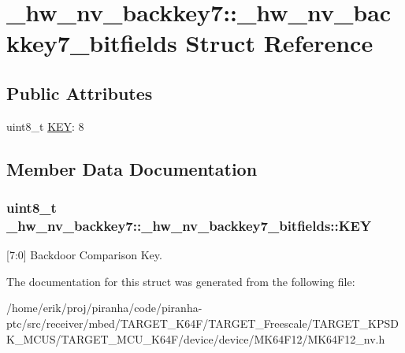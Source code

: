 \hypertarget{struct__hw__nv__backkey7_1_1__hw__nv__backkey7__bitfields}{}\section{\+\_\+hw\+\_\+nv\+\_\+backkey7\+:\+:\+\_\+hw\+\_\+nv\+\_\+backkey7\+\_\+bitfields Struct Reference}
\label{struct__hw__nv__backkey7_1_1__hw__nv__backkey7__bitfields}
\subsection*{Public Attributes}
\begin{DoxyCompactItemize}
\item 
uint8\+\_\+t \hyperlink{struct__hw__nv__backkey7_1_1__hw__nv__backkey7__bitfields_ab794b65e020e429fd70de58dee9d775e}{K\+EY}\+: 8
\end{DoxyCompactItemize}


\subsection{Member Data Documentation}
\subsubsection[{\texorpdfstring{K\+EY}{KEY}}]{\setlength{\rightskip}{0pt plus 5cm}uint8\+\_\+t \+\_\+hw\+\_\+nv\+\_\+backkey7\+::\+\_\+hw\+\_\+nv\+\_\+backkey7\+\_\+bitfields\+::\+K\+EY}\hypertarget{struct__hw__nv__backkey7_1_1__hw__nv__backkey7__bitfields_ab794b65e020e429fd70de58dee9d775e}{}\label{struct__hw__nv__backkey7_1_1__hw__nv__backkey7__bitfields_ab794b65e020e429fd70de58dee9d775e}
\mbox{[}7\+:0\mbox{]} Backdoor Comparison Key. 

The documentation for this struct was generated from the following file\+:\begin{DoxyCompactItemize}
\item 
/home/erik/proj/piranha/code/piranha-\/ptc/src/receiver/mbed/\+T\+A\+R\+G\+E\+T\+\_\+\+K64\+F/\+T\+A\+R\+G\+E\+T\+\_\+\+Freescale/\+T\+A\+R\+G\+E\+T\+\_\+\+K\+P\+S\+D\+K\+\_\+\+M\+C\+U\+S/\+T\+A\+R\+G\+E\+T\+\_\+\+M\+C\+U\+\_\+\+K64\+F/device/device/\+M\+K64\+F12/M\+K64\+F12\+\_\+nv.\+h\end{DoxyCompactItemize}
